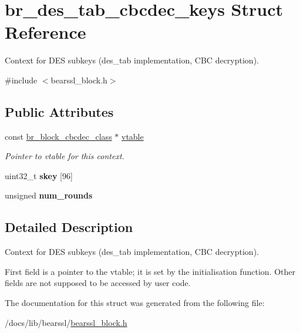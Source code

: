 \hypertarget{structbr__des__tab__cbcdec__keys}{}\section{br\+\_\+des\+\_\+tab\+\_\+cbcdec\+\_\+keys Struct Reference}
\label{structbr__des__tab__cbcdec__keys}


Context for D\+ES subkeys ({\ttfamily des\+\_\+tab} implementation, C\+BC decryption).  




{\ttfamily \#include $<$bearssl\+\_\+block.\+h$>$}

\subsection*{Public Attributes}
\begin{DoxyCompactItemize}
\item 
\mbox{\label{structbr__des__tab__cbcdec__keys_a9b6ad5c87e21163110486fee3336542d}} 
const \hyperlink{bearssl__block_8h_a5542970c820eeee2e62766368be8fb7f}{br\+\_\+block\+\_\+cbcdec\+\_\+class} $\ast$ \hyperlink{structbr__des__tab__cbcdec__keys_a9b6ad5c87e21163110486fee3336542d}{vtable}
\begin{DoxyCompactList}\small\item\em Pointer to vtable for this context. \end{DoxyCompactList}\item 
\mbox{\label{structbr__des__tab__cbcdec__keys_ad97b8a0f2191c7d8898bbaa1d21ab16c}} 
uint32\+\_\+t {\bfseries skey} \mbox{[}96\mbox{]}
\item 
\mbox{\label{structbr__des__tab__cbcdec__keys_a558181eec113f6ab1915240760e34163}} 
unsigned {\bfseries num\+\_\+rounds}
\end{DoxyCompactItemize}


\subsection{Detailed Description}
Context for D\+ES subkeys ({\ttfamily des\+\_\+tab} implementation, C\+BC decryption). 

First field is a pointer to the vtable; it is set by the initialisation function. Other fields are not supposed to be accessed by user code. 

The documentation for this struct was generated from the following file\+:\begin{DoxyCompactItemize}
\item 
/docs/lib/bearssl/\hyperlink{bearssl__block_8h}{bearssl\+\_\+block.\+h}\end{DoxyCompactItemize}
